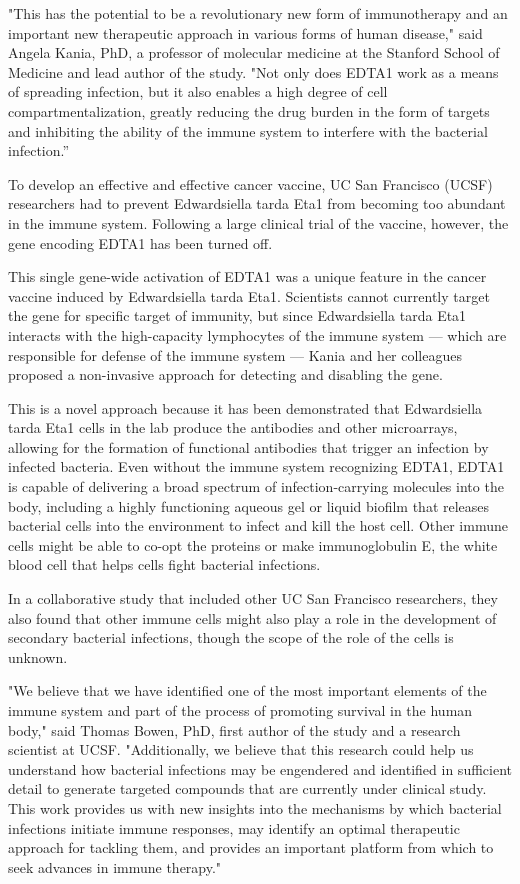 \documentclass{article}
\begin{document}
"This has the potential to be a revolutionary new form of immunotherapy and an important new therapeutic approach in various forms of human disease," said Angela Kania, PhD, a professor of molecular medicine at the Stanford School of Medicine and lead author of the study. "Not only does EDTA1 work as a means of spreading infection, but it also enables a high degree of cell compartmentalization, greatly reducing the drug burden in the form of targets and inhibiting the ability of the immune system to interfere with the bacterial infection.”

To develop an effective and effective cancer vaccine, UC San Francisco (UCSF) researchers had to prevent Edwardsiella tarda Eta1 from becoming too abundant in the immune system. Following a large clinical trial of the vaccine, however, the gene encoding EDTA1 has been turned off.

This single gene-wide activation of EDTA1 was a unique feature in the cancer vaccine induced by Edwardsiella tarda Eta1. Scientists cannot currently target the gene for specific target of immunity, but since Edwardsiella tarda Eta1 interacts with the high-capacity lymphocytes of the immune system — which are responsible for defense of the immune system — Kania and her colleagues proposed a non-invasive approach for detecting and disabling the gene.

This is a novel approach because it has been demonstrated that Edwardsiella tarda Eta1 cells in the lab produce the antibodies and other microarrays, allowing for the formation of functional antibodies that trigger an infection by infected bacteria. Even without the immune system recognizing EDTA1, EDTA1 is capable of delivering a broad spectrum of infection-carrying molecules into the body, including a highly functioning aqueous gel or liquid biofilm that releases bacterial cells into the environment to infect and kill the host cell. Other immune cells might be able to co-opt the proteins or make immunoglobulin E, the white blood cell that helps cells fight bacterial infections.

In a collaborative study that included other UC San Francisco researchers, they also found that other immune cells might also play a role in the development of secondary bacterial infections, though the scope of the role of the cells is unknown.

"We believe that we have identified one of the most important elements of the immune system and part of the process of promoting survival in the human body," said Thomas Bowen, PhD, first author of the study and a research scientist at UCSF. "Additionally, we believe that this research could help us understand how bacterial infections may be engendered and identified in sufficient detail to generate targeted compounds that are currently under clinical study. This work provides us with new insights into the mechanisms by which bacterial infections initiate immune responses, may identify an optimal therapeutic approach for tackling them, and provides an important platform from which to seek advances in immune therapy."
\end{document}
